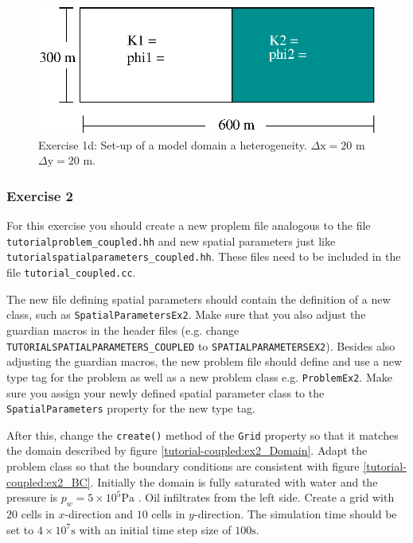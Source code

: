 \begin{enumerate}
\begin{figure}[h]
\centering
\includegraphics[width=0.5\linewidth,keepaspectratio]{EPS/exercise1_c.eps}
\caption{Exercise 1d: Set-up of a model domain a heterogeneity. $\Delta \text{x} = 20$ m $\Delta \text{y} = 20$ m.}\label{tutorial-coupled:exercise1_d}
\end{figure}

\end{enumerate}

\subsubsection{Exercise 2}
For this exercise you should create a new proplem file analogous to
the file \texttt{tutorialproblem\_coupled.hh} and new spatial parameters 
just like \texttt{tutorialspatialparameters\_coupled.hh}. These files need to
be included in the file \texttt{tutorial\_coupled.cc}. 

The new file defining spatial parameters should contain the definition 
of a new class, such as \texttt{SpatialParametersEx2}. Make sure that you also adjust the guardian
macros in the header files (e.g. change \texttt{TUTORIALSPATIALPARAMETERS\_COUPLED} to
\texttt{SPATIALPARAMETERSEX2}). Besides also adjusting the guardian macros, 
the new problem file should define and use a new type tag for the problem as well as a new problem class
e.g. \texttt{ProblemEx2}. Make sure you assign your newly defined spatial 
parameter class to the \texttt{SpatialParameters} property for the new 
type tag. 

After this, change the \texttt{create()} method of the \texttt{Grid}
property so that it matches the domain described
by figure \ref{tutorial-coupled:ex2_Domain}. Adapt the problem class
so that the boundary conditions are consistent with figure
\ref{tutorial-coupled:ex2_BC}. Initially the domain is fully saturated
with water and the pressure is $p_w = 5 \times 10^5 \text{Pa}$ . Oil
infiltrates from the left side. Create a grid with $20$ cells in
$x$-direction and $10$ cells in $y$-direction. The simulation time
should be set to $4\times 10^7 \text{s}$ with an initial time step size of
$100 \text{s}$.

